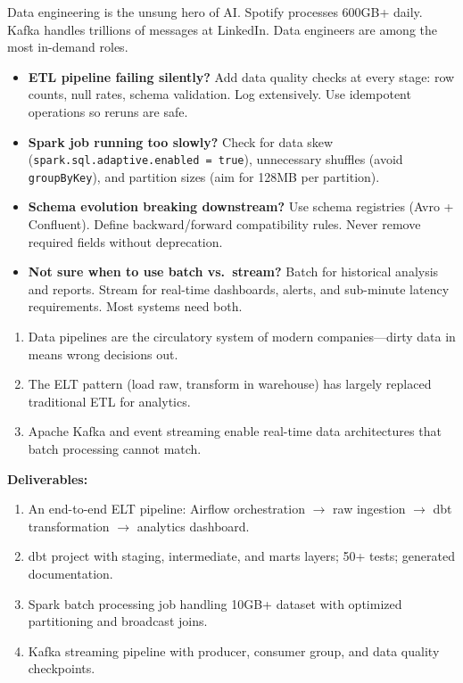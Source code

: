 \documentclass[11pt, a4paper, oneside]{report}
\newcommand{\arrow}{$\rightarrow$}
\begin{document}
\begin{realworldbox}
Data engineering is the unsung hero of AI. Spotify processes 600GB+ daily. Kafka handles trillions of messages at LinkedIn. Data engineers are among the most in-demand roles.
\end{realworldbox}


\begin{stuckbox}
\begin{itemize}[leftmargin=*]
\item \textbf{ETL pipeline failing silently?} Add data quality checks at every stage: row counts, null rates, schema validation. Log extensively. Use idempotent operations so reruns are safe.
\item \textbf{Spark job running too slowly?} Check for data skew (\texttt{spark.sql.adaptive.enabled = true}), unnecessary shuffles (avoid \texttt{groupByKey}), and partition sizes (aim for 128MB per partition).
\item \textbf{Schema evolution breaking downstream?} Use schema registries (Avro + Confluent). Define backward/forward compatibility rules. Never remove required fields without deprecation.
\item \textbf{Not sure when to use batch vs.\ stream?} Batch for historical analysis and reports. Stream for real-time dashboards, alerts, and sub-minute latency requirements. Most systems need both.
\end{itemize}
\end{stuckbox}


\begin{takeawaybox}
\begin{enumerate}[leftmargin=*]
\item Data pipelines are the circulatory system of modern companies---dirty data in means wrong decisions out.
\item The ELT pattern (load raw, transform in warehouse) has largely replaced traditional ETL for analytics.
\item Apache Kafka and event streaming enable real-time data architectures that batch processing cannot match.
\end{enumerate}
\end{takeawaybox}

\begin{milestonebox}
\textbf{Deliverables:}
\begin{enumerate}[leftmargin=*]
\item An end-to-end ELT pipeline: Airflow orchestration \arrow{} raw ingestion \arrow{} dbt transformation \arrow{} analytics dashboard.
\item dbt project with staging, intermediate, and marts layers; 50+ tests; generated documentation.
\item Spark batch processing job handling 10GB+ dataset with optimized partitioning and broadcast joins.
\item Kafka streaming pipeline with producer, consumer group, and data quality checkpoints.
\end{enumerate}
\end{milestonebox}
\end{document}
